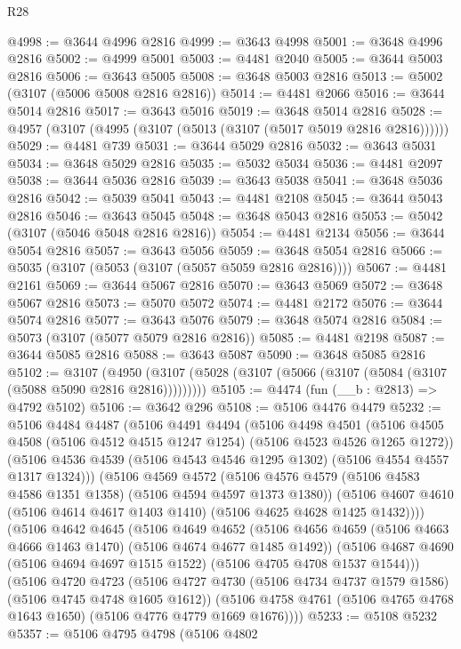 \begin{lexlean}{R28}
\begin{coremodule}
@4998 := @3644 @4996 @2816
@4999 := @3643 @4998
@5001 := @3648 @4996 @2816
@5002 := @4999 @5001
@5003 := @4481 @2040
@5005 := @3644 @5003 @2816
@5006 := @3643 @5005
@5008 := @3648 @5003 @2816
@5013 := @5002 (@3107 (@5006 @5008 @2816 @2816))
@5014 := @4481 @2066
@5016 := @3644 @5014 @2816
@5017 := @3643 @5016
@5019 := @3648 @5014 @2816
@5028 := @4957 (@3107 (@4995 (@3107 (@5013 (@3107 (@5017 @5019 @2816 @2816))))))
@5029 := @4481 @739
@5031 := @3644 @5029 @2816
@5032 := @3643 @5031
@5034 := @3648 @5029 @2816
@5035 := @5032 @5034
@5036 := @4481 @2097
@5038 := @3644 @5036 @2816
@5039 := @3643 @5038
@5041 := @3648 @5036 @2816
@5042 := @5039 @5041
@5043 := @4481 @2108
@5045 := @3644 @5043 @2816
@5046 := @3643 @5045
@5048 := @3648 @5043 @2816
@5053 := @5042 (@3107 (@5046 @5048 @2816 @2816))
@5054 := @4481 @2134
@5056 := @3644 @5054 @2816
@5057 := @3643 @5056
@5059 := @3648 @5054 @2816
@5066 := @5035 (@3107 (@5053 (@3107 (@5057 @5059 @2816 @2816))))
@5067 := @4481 @2161
@5069 := @3644 @5067 @2816
@5070 := @3643 @5069
@5072 := @3648 @5067 @2816
@5073 := @5070 @5072
@5074 := @4481 @2172
@5076 := @3644 @5074 @2816
@5077 := @3643 @5076
@5079 := @3648 @5074 @2816
@5084 := @5073 (@3107 (@5077 @5079 @2816 @2816))
@5085 := @4481 @2198
@5087 := @3644 @5085 @2816
@5088 := @3643 @5087
@5090 := @3648 @5085 @2816
@5102 := @3107
    (@4950 (@3107 (@5028 (@3107 (@5066 (@3107 (@5084 (@3107 (@5088 @5090 @2816 @2816)))))))))
@5105 := @4474 (fun (__b : @2813) => @4792 @5102)
@5106 := @3642 @296
@5108 := @5106 @4476 @4479
@5232 := @5106
    @4484
    @4487
    (@5106
      @4491
      @4494
      (@5106
        @4498
        @4501
        (@5106 @4505 @4508 (@5106 @4512 @4515 @1247 @1254) (@5106 @4523 @4526 @1265 @1272))
        (@5106 @4536 @4539 (@5106 @4543 @4546 @1295 @1302) (@5106 @4554 @4557 @1317 @1324)))
      (@5106
        @4569
        @4572
        (@5106 @4576 @4579 (@5106 @4583 @4586 @1351 @1358) (@5106 @4594 @4597 @1373 @1380))
        (@5106 @4607 @4610 (@5106 @4614 @4617 @1403 @1410) (@5106 @4625 @4628 @1425 @1432))))
    (@5106
      @4642
      @4645
      (@5106
        @4649
        @4652
        (@5106 @4656 @4659 (@5106 @4663 @4666 @1463 @1470) (@5106 @4674 @4677 @1485 @1492))
        (@5106 @4687 @4690 (@5106 @4694 @4697 @1515 @1522) (@5106 @4705 @4708 @1537 @1544)))
      (@5106
        @4720
        @4723
        (@5106 @4727 @4730 (@5106 @4734 @4737 @1579 @1586) (@5106 @4745 @4748 @1605 @1612))
        (@5106 @4758 @4761 (@5106 @4765 @4768 @1643 @1650) (@5106 @4776 @4779 @1669 @1676))))
@5233 := @5108 @5232
@5357 := @5106
    @4795
    @4798
    (@5106
      @4802

\end{coremodule}
\end{lexlean}
